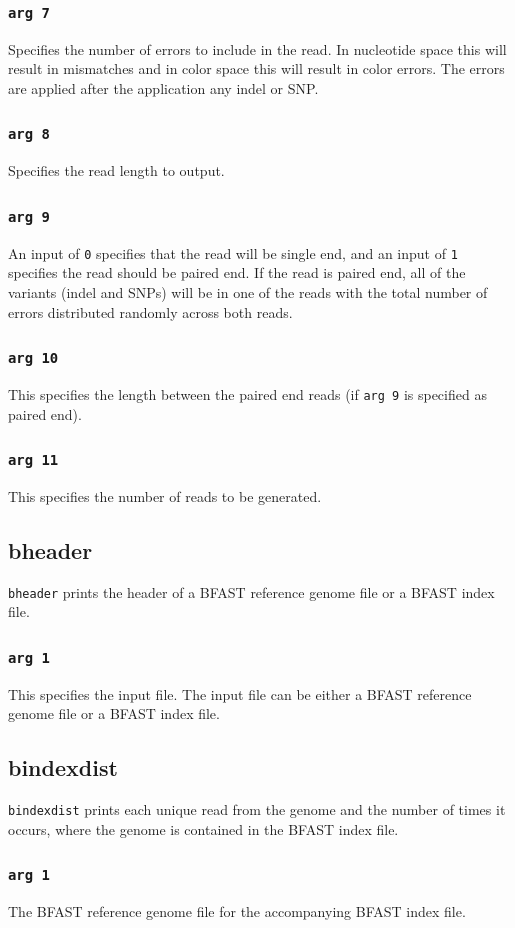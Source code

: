 \documentclass[a4paper,12pt]{book}
\newcommand{\TT}[1]{{\tt #1}} %
\newcommand{\BRGF}{BFAST reference genome file} %
\newcommand{\BIF}{BFAST index file} %
\begin{document}
\subsubsection{\TT{arg 7}}
Specifies the number of errors to include in the read.
In nucleotide space this will result in mismatches and in color space this will result in color errors.
The errors are applied after the application any indel or SNP.
\subsubsection{\TT{arg 8}}
Specifies the read length to output.
\subsubsection{\TT{arg 9}}
An input of \TT{0} specifies that the read will be single end, and an input of \TT{1} specifies the read should be paired end.
If the read is paired end, all of the variants (indel and SNPs) will be in one of the reads with the total number of errors distributed randomly across both reads.
\subsubsection{\TT{arg 10}}
This specifies the length between the paired end reads (if \TT{arg 9} is specified as paired end).
\subsubsection{\TT{arg 11}}
This specifies the number of reads to be generated.

\subsection{bheader}
\label{sec:bheader}
\TT{bheader} prints the header of a \BRGF{} or a \BIF{}.
\subsubsection{\TT{arg 1}}
This specifies the input file.  
The input file can be either a \BRGF{} or a \BIF{}.

\subsection{bindexdist}
\label{sec:bindexdist}
\TT{bindexdist} prints each unique read from the genome and the number of times it occurs, where the genome is contained in the \BIF{}.
\subsubsection{\TT{arg 1}}
The \BRGF{} for the accompanying \BIF{}.
\end{document}
